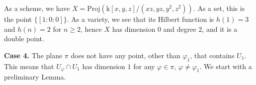 \documentclass[10pt,reqno]{amsart}
\newcommand{\la}{\langle}
\newcommand{\ra}{\rangle}
\newcommand{\RR}{\mathbb{R}}
\newcommand{\f}{\varphi}
\newcommand{\kk}{\mathrm{k}}
\theoremstyle{definition}
\begin{document}
\noindent As a scheme, we have $X=\mathrm{Proj}(\kk[x,y,z]/(xz,yz,y^2,z^2))$. As a set, this is the point $\{[1:0:0]\}$. As a variety, we see that its Hilbert function is $h(1)=3$ and $h(n)=2$ for $n\geq 2$, hence $X$ has dimension $0$ and degree $2$, and it is a double point.

\noindent \textbf{Case 4.} The plane $\pi$ does not have any point, other than $\f_1$, that contains $U_1$. This means that $U_{\f} \cap U_1$ has dimension $1$ for any $\f \in \pi$, $\f \ne \f_1$. We start with a preliminary Lemma.


\end{document}
